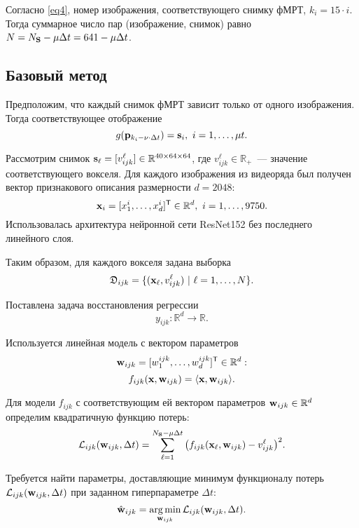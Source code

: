 \documentclass[a4paper, 12pt]{article}
\begin{document}
	Согласно \eqref{eq4}, номер изображения, соответствующего снимку фМРТ, $k_i = 15 \cdot i$.
	Тогда суммарное число пар (изображение, снимок) равно $N = N_{\mathbf{S}} - \mu \Delta t = 641 - \mu \Delta t$.

\subsection{Базовый метод}

	Предположим, что каждый снимок фМРТ зависит только от одного изображения. Тогда соответствующее
	отображение
	\begin{equation}
		\label{eq5}
		g(\mathbf{p}_{k_i - \nu \cdot \Delta t}) = \mathbf{s}_i, \ i = 1, \ldots, \mu t.
	\end{equation}

	Рассмотрим снимок $\mathbf{s}_{\ell} = [v^{\ell}_{ijk}] \in \mathbb{R}^{40 \times 64 \times 64}$,
	где $v^{\ell}_{ijk} \in \mathbb{R}_+$~--- значение соответствующего вокселя.
	Для каждого изображения из видеоряда был получен вектор признакового описания
	размерности $d = 2048$:
	\[ \mathbf{x}_i = [x^i_1, \ldots, x^i_{d}]^{\mathsf{T}} \in \mathbb{R}^{d}, \ i = 1, \ldots, 9750. \]
	Использовалась архитектура нейронной сети ResNet152 без последнего линейного слоя.
	
	Таким образом, для каждого вокселя задана выборка
	\[ \mathfrak{D}_{ijk} = \{(\mathbf{x}_{\ell}, v^{\ell}_{ijk}) \ | \ {\ell} = 1, \ldots, N \}. \]

	Поставлена задача восстановления регрессии
	\begin{equation}
		\label{eq6}
		y_{ijk}: \mathbb{R}^{d} \to \mathbb{R}.
	\end{equation}
	
	Используется линейная модель с вектором параметров 
	\[ \mathbf{w}_{ijk} = [w^{ijk}_1, \ldots, w^{ijk}_{d}]^{\mathsf{T}} \in \mathbb{R}^{d}: \]
	\begin{equation}
		\label{eq7}
		f_{ijk}(\mathbf{x}, \mathbf{w}_{ijk}) = \langle \mathbf{x}, \mathbf{w}_{ijk} \rangle.
	\end{equation}

	Для модели $f_{ijk}$ с соответствующим ей вектором параметров $\mathbf{w}_{ijk} \in \mathbb{R}^{d}$
	определим квадратичную функцию потерь:
	\begin{equation}
		\label{eq8}
		\mathcal{L}_{ijk}(\mathbf{w}_{ijk}, \Delta t) = \sum\limits_{\ell = 1}^{N_{\mathbf{S}} - \mu \Delta t} \big(f_{ijk}(\mathbf{x}_{\ell}, \mathbf{w}_{ijk}) - v^{\ell}_{ijk}\big)^2.
	\end{equation}

	Требуется найти параметры, доставляющие минимум функционалу потерь $\mathcal{L}_{ijk}(\mathbf{w}_{ijk}, \Delta t)$
	при заданном гиперпараметре $\Delta t$:
	\begin{equation}
		\label{eq9}
		\hat{\mathbf{w}}_{ijk} = \operatorname*{arg\,min}_{\mathbf{w}_{ijk}} \mathcal{L}_{ijk}(\mathbf{w}_{ijk}, \Delta t).
	\end{equation}
\end{document}
